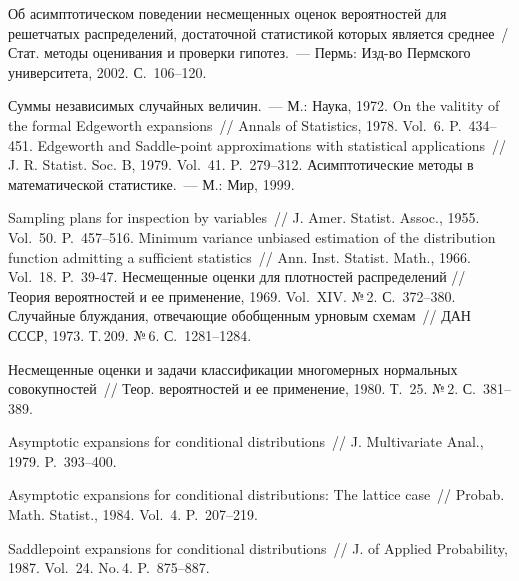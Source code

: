 \begin{multicols}{2}
{{\begin{thebibliography}{99}
Об асимптотическом поведении несмещенных оценок
вероятностей для решетчатых распределений, достаточной статистикой
которых является среднее~/ Стат. методы оценивания и проверки
гипотез.~--- Пермь: Изд-во Пермского университета, 2002. С.~106--120.

Суммы независимых случайных величин.~--- М.: Наука, 1972.
On the valitity of the
formal Edgeworth expansions~// Annals of Statistics, 1978. Vol.~6. P.~434--451.
Edgeworth and
Saddle-point approximations with statistical applications~// J. R.
Statist. Soc. B, 1979. Vol.~41. P.~279--312.
Асимптотические методы в
математической статистике.~--- М.: Мир, 1999. 

Sampling plans
for inspection by variables~// J. Amer. Statist. Assoc., 1955.
Vol.~50. P.~457--516.
Minimum variance unbiased
estimation of the distribution function admitting a sufficient
statistics~// Ann. Inst. Statist. Math., 1966. Vol.~18. P.~39-47.
Несмещенные оценки для
 плотностей распределений // Теория вероятностей и ее применение, 1969.
Vol.~XIV. №\,2. С.~372--380.
Случайные блуждания, отвечающие
обобщенным урновым схемам~// ДАН СССР, 1973. Т.\,209. №\,6. С.~1281--1284.

Несмещенные оценки
и задачи классификации многомерных нормальных совокупностей~// Теор.
вероятностей и ее применение, 1980. Т.~25. №\,2. С.~381--389.


Asymptotic expansions for conditional distributions~//
J. Multivariate Anal., 1979. P.~393--400.

Asymptotic expansions for conditional distributions:
The lattice case~// Probab. Math. Statist., 1984. Vol.~4. P.~207--219.

Saddlepoint expansions for conditional
distributions~// J. of Applied Probability, 1987. Vol.~24. No.\,4.
P.~875--887.


\end{thebibliography}}}
\end{multicols}

